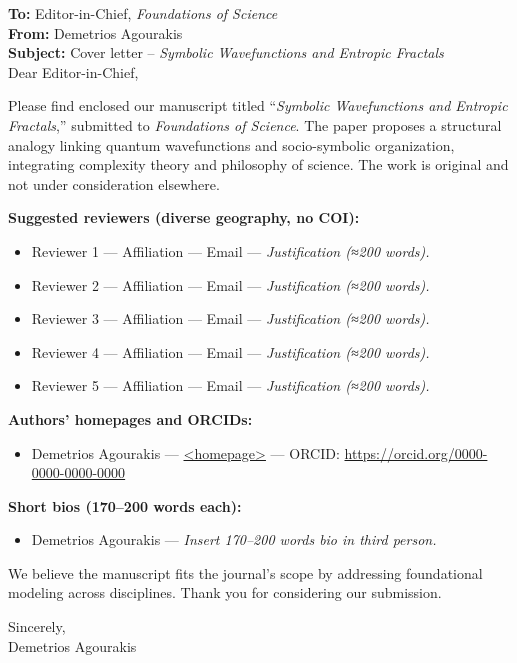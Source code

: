 \documentclass[11pt]{article}
\begin{document}
\noindent \textbf{To:} Editor-in-Chief, \emph{Foundations of Science}\\
\textbf{From:} Demetrios Agourakis\\
\textbf{Subject:} Cover letter – \emph{Symbolic Wavefunctions and Entropic Fractals}\\[6pt]

Dear Editor-in-Chief,

Please find enclosed our manuscript titled “\emph{Symbolic Wavefunctions and Entropic Fractals},” submitted to \emph{Foundations of Science}. The paper proposes a structural analogy linking quantum wavefunctions and socio-symbolic organization, integrating complexity theory and philosophy of science. The work is original and not under consideration elsewhere.

\textbf{Suggested reviewers (diverse geography, no COI):}\\[-4pt]
\begin{itemize}
  \item Reviewer 1 — Affiliation — Email — \emph{Justification (≈200 words).}
  \item Reviewer 2 — Affiliation — Email — \emph{Justification (≈200 words).}
  \item Reviewer 3 — Affiliation — Email — \emph{Justification (≈200 words).}
  \item Reviewer 4 — Affiliation — Email — \emph{Justification (≈200 words).}
  \item Reviewer 5 — Affiliation — Email — \emph{Justification (≈200 words).}
\end{itemize}

\textbf{Authors’ homepages and ORCIDs:}\\[-4pt]
\begin{itemize}
  \item Demetrios Agourakis — \url{<homepage>} — ORCID: \url{https://orcid.org/0000-0000-0000-0000}
\end{itemize}

\textbf{Short bios (170–200 words each):}\\[-4pt]
\begin{itemize}
  \item Demetrios Agourakis — \emph{Insert 170–200 words bio in third person.}
\end{itemize}

We believe the manuscript fits the journal’s scope by addressing foundational modeling across disciplines. Thank you for considering our submission.

Sincerely,\\[3pt]
Demetrios Agourakis
\end{document}
